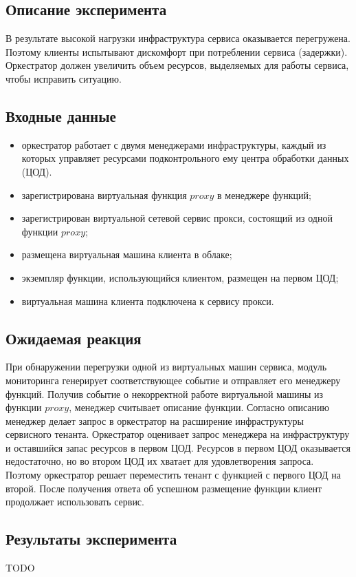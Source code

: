 \documentclass[oneside,final,14pt,a4paper]{extreport}
\begin{document}
\subsection{Описание эксперимента}
В результате высокой нагрузки инфраструктура сервиса оказывается перегружена. Поэтому клиенты испытывают дискомфорт при потреблении сервиса (задержки). Оркестратор должен увеличить объем ресурсов, выделяемых для работы сервиса, чтобы исправить ситуацию.

\subsection{Входные данные}
\begin{itemize}
	\item оркестратор работает с двумя менеджерами инфраструктуры, каждый из которых управляет ресурсами подконтрольного ему центра обработки данных (ЦОД).
	\item зарегистрирована виртуальная функция $proxy$ в менеджере функций;
	\item зарегистрирован виртуальной сетевой сервис прокси, состоящий из одной функции $proxy$;
	\item размещена виртуальная машина клиента в облаке;
	\item экземпляр функции, использующийся клиентом, размещен на первом ЦОД;
	\item виртуальная машина клиента подключена к сервису прокси.
\end{itemize}

\subsection{Ожидаемая реакция}
При обнаружении перегрузки одной из виртуальных машин сервиса, модуль мониторинга генерирует соответствующее событие и отправляет его менеджеру функций. Получив событие о некорректной работе виртуальной машины из функции $proxy$, менеджер считывает описание функции. Согласно описанию менеджер делает запрос в оркестратор на расширение инфраструктуры сервисного тенанта. Оркестратор оценивает запрос менеджера на инфраструктуру и оставшийся запас ресурсов в первом ЦОД. Ресурсов в первом ЦОД оказывается недостаточно, но во втором ЦОД их хватает для удовлетворения запроса. Поэтому оркестратор решает переместить тенант с функцией с первого ЦОД на второй. После получения ответа об успешном размещение функции клиент продолжает использовать сервис.

\subsection{Результаты эксперимента}
TODO
\end{document}
